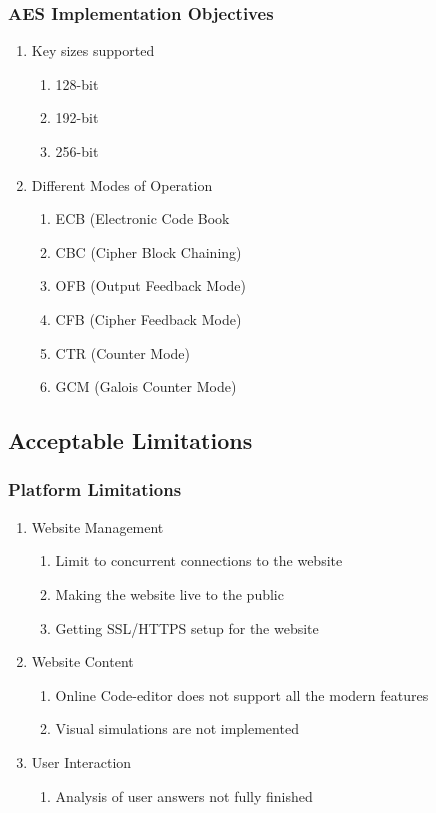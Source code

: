 \subsubsection{AES Implementation Objectives}

\begin{enumerate}
\item{Key sizes supported
	\begin{enumerate}
		\item{128-bit}
		\item{192-bit}
		\item{256-bit}
	\end{enumerate}
}
\item{
Different Modes of Operation
	\begin{enumerate}
		\item{ECB (Electronic Code Book}
		\item{CBC (Cipher Block Chaining)}
		\item{OFB (Output Feedback Mode)}
		\item{CFB (Cipher Feedback Mode)}
		\item{CTR (Counter Mode)}
		\item{GCM (Galois Counter Mode)}
	\end{enumerate}
}
\end{enumerate}


\subsection{Acceptable Limitations}
\subsubsection{Platform Limitations}

\begin{enumerate}
\item{
Website Management
	\begin{enumerate}
		\item{Limit to concurrent connections to the website}
		\item{Making the website live to the public}
		\item{Getting SSL/HTTPS setup for the website}
	\end{enumerate}
}
\item{
Website Content
	\begin{enumerate}
		\item{Online Code-editor does not support all the modern features}
		\item{Visual simulations are not implemented}
	\end{enumerate}
}
\item{
User Interaction
	\begin{enumerate}
		\item{Analysis of user answers not fully finished}
	\end{enumerate}
}
\end{enumerate}

